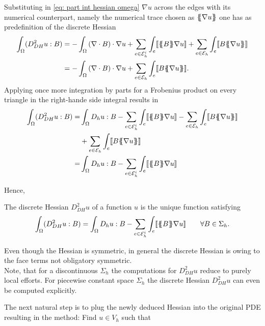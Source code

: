 Substituting in \eqref{eq: part int hessian omega} $\nabla u$ across the edges with its numerical counterpart, namely the numerical trace chosen as $\{\!\!\{ \nabla u \}\!\!\}$ one has as predefinition of the discrete Hessian
	\begin{align}
		\int_\Omega (D_{DH}^2 u : B) 
		&= - \int_\Omega \left(\nabla \cdot B\right) \cdot \nabla u
		+ \sum_{ e \in \edgesi} \int_e  \jump {\average B \nabla u } 
				+ \sum_{ e \in \edges} \int_e \jump {B \average {\nabla u} }  \nonumber \\
		&= - \int_\Omega \left(\nabla \cdot B\right) \cdot \nabla u
				+ \sum_{ e \in \edges} \int_e  \jump{B \average {\nabla u} }.	
	\end{align}
Applying once more integration by parts for a Frobenius product on every triangle in the right-hande side integral results in
	\begin{align}
		\int_\Omega (D_{DH}^2 u : B) 
		=& \int_\Omega D_h u: B 
			-\sum_{ e \in \edgesi} \int_e  \jump {\average B  \nabla u }
			- \sum_{ e \in \edges} \int_e \jump {B \average {\nabla u} }\nonumber \\		
			&+ \sum_{ e \in \edges} \int_e  \jump {B \average {\nabla u} }		\nonumber \\
		=& \int_\Omega D_h u: B -\sum_{ e \in \edgesi} \int_e  \jump {\average B  \nabla u }				
	\end{align}

Hence,
\begin{definition}
	The discrete Hessian $D_{DH}^2 u$ of a function $u$ is the unique function satisfying
	\begin{align}
		\int_\Omega (D_{DH}^2 u : B) 
		= \int_\Omega D_h u: B -\sum_{ e \in \mathcal{E}_h^i} \int_e  \llbracket \{\!\!\{ B \}\!\!\} \nabla u  \rrbracket\qquad \forall B \in \Sigma_h. \label{eq: discrete hessian}
	\end{align}
\end{definition}

Even though the Hessian is symmetric, in general the discrete Hessian is owing to the face terms not obligatory symmetric. \\
Note, that for a discontinuous $\Sigma_h$ the computations for $D_{DH}^2 u$ reduce to purely local efforts. For piecewise constant space $\Sigma_h$ the discrete Hessian $D_{DH}^2 u$ can even be computed explicitly.

The next natural step is to plug the newly deduced Hessian into the original \MA PDE resulting in the method: Find $u \in V_h$ such that

